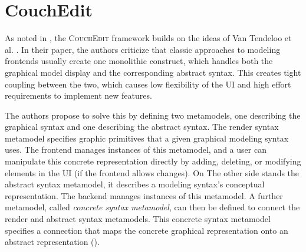 \section{CouchEdit}
\label{sec:CouchEdit}








As noted in , the \textsc{CouchEdit} framework builds on the ideas of Van Tendeloo et al. \cite{van_tendeloo_concrete_2017}. In their paper, the authors criticize that classic approaches to modeling frontends usually create one monolithic construct, which handles both the graphical model display and the corresponding abstract syntax. This creates tight coupling between the two, which causes low flexibility of the UI and high effort requirements to implement new features. 

The authors propose to solve this by defining two metamodels, one describing the graphical syntax and one describing the abstract syntax. The render syntax metamodel specifies graphic primitives that a given graphical modeling syntax uses. The frontend manages instances of this metamodel, and a user can manipulate this concrete representation directly by adding, deleting, or modifying elements in the UI (if the frontend allows changes). On The other side stands the abstract syntax metamodel, it describes a modeling syntax's conceptual representation. The backend manages instances of this metamodel. A further metamodel, called \emph{concrete syntax metamodel}, can then be defined to connect the render and abstract syntax metamodels. This concrete syntax metamodel specifies a connection that maps the concrete graphical representation onto an abstract representation ().


